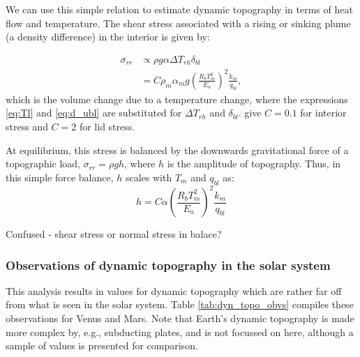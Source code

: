 \documentclass[10pt,a4paper]{article}
\begin{document}
We can use this simple relation to estimate dynamic topography in terms of heat flow and temperature. The shear stress associated with a rising or sinking plume (a density difference) in the interior is given by:

\begin{align}
\sigma_{rr} &\propto \rho g \alpha \Delta T_{rh} \delta_{bl} \\
&= C \rho_m \alpha_m g \left(\frac{R_b T_m^2}{E_a}\right)^2 \frac{k_m}{q_{bl}},
\end{align}
which is the volume change due to a temperature change, where the expressions \ref{eq:Tl} and \ref{eq:d_ubl} are substituted for $\Delta T_{rh}$ and $\delta_{bl}$. \citet{Reese2005} give $C = 0.1$ for interior stress and $C = 2$ for lid stress.

At equilibrium, this stress is balanced by the downwards gravitational force of a topographic load, $\sigma_{rr} = \rho g h$, where $h$ is the amplitude of topography. Thus, in this simple force balance, $h$ scales with $T_m$ and $q_{bl}$ as:
\begin{equation}
h = C \alpha \left(\frac{R_b T_m^2}{E_a}\right)^2 \frac{k_m}{q_{bl}}
\end{equation}

Confused - shear stress or normal stress in balace?

\subsubsection{Observations of dynamic topography in the solar system}

This analysis results in values for dynamic topography which are rather far off from what is seen in the solar system. Table \ref{tab:dyn_topo_obvs} compiles these observations for Venus and Mars. Note that Earth's dynamic topography is made more complex by, e.g., subducting plates, and is not focussed on here, although a sample of values is presented for comparison.\\
\end{document}
